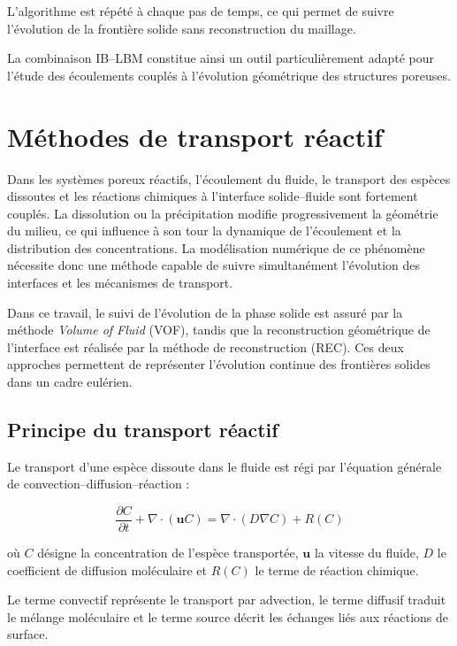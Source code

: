 \documentclass[12pt,a4paper]{report}
\begin{document}
L’algorithme est répété à chaque pas de temps, ce qui permet de suivre l’évolution de la frontière solide sans reconstruction du maillage.

La combinaison IB--LBM constitue ainsi un outil particulièrement adapté pour l’étude des écoulements couplés à l’évolution géométrique des structures poreuses.

\section{Méthodes de transport réactif}

Dans les systèmes poreux réactifs, l’écoulement du fluide, le transport des espèces dissoutes et les réactions chimiques à l’interface solide--fluide sont fortement couplés. La dissolution ou la précipitation modifie progressivement la géométrie du milieu, ce qui influence à son tour la dynamique de l’écoulement et la distribution des concentrations. La modélisation numérique de ce phénomène nécessite donc une méthode capable de suivre simultanément l’évolution des interfaces et les mécanismes de transport.

Dans ce travail, le suivi de l’évolution de la phase solide est assuré par la méthode \textit{Volume of Fluid} (VOF), tandis que la reconstruction géométrique de l’interface est réalisée par la méthode de reconstruction (REC). Ces deux approches permettent de représenter l’évolution continue des frontières solides dans un cadre eulérien.

\subsection{Principe du transport réactif}

Le transport d’une espèce dissoute dans le fluide est régi par l’équation générale de convection--diffusion--réaction :

\begin{equation}
\frac{\partial C}{\partial t}
+
\nabla \cdot (\mathbf{u}C)
=
\nabla \cdot (D \nabla C)
+
R(C)
\end{equation}

où $C$ désigne la concentration de l’espèce transportée, $\mathbf{u}$ la vitesse du fluide, $D$ le coefficient de diffusion moléculaire et $R(C)$ le terme de réaction chimique.

Le terme convectif représente le transport par advection, le terme diffusif traduit le mélange moléculaire et le terme source décrit les échanges liés aux réactions de surface.
\end{document}
